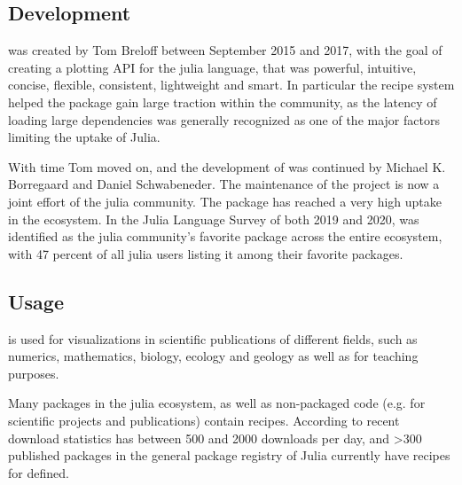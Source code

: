 \subsection*{Development}

\Plots was created by Tom Breloff between September 2015 and 2017, with the goal of creating a plotting API for the julia\cite{bezansonJuliaFreshApproach2017a} language, that was powerful, intuitive, concise, flexible, consistent, lightweight and smart.
In particular the recipe system helped the package gain large traction within the community, as the latency of loading large dependencies was generally recognized as one of the major factors limiting the uptake of Julia.

With time Tom moved on, and the development of \Plots was continued by Michael K. Borregaard and Daniel Schwabeneder.
The maintenance of the project is now a joint effort of the julia community.
The package has reached a very high uptake in the ecosystem.
In the Julia Language Survey of both 2019\cite{shahJuliaUserDeveloper} and 2020\cite{shah2020JuliaUser}, \Plots was identified as the julia community's favorite package across the entire ecosystem, with 47 percent of all julia users listing it among their favorite packages.

\subsection*{Usage}

\Plots is used for visualizations in scientific publications of different fields, such as numerics\cite{rackauckasDifferentialEquationsJlPerformant2017a,baggecarlsonMonteCarloMeasurementsJlPropagation2019,caldwellBATJlUpgrading2020,cufarRipsererJlFlexible2020,fairbrotherGaussianProcessesJlNonparametric2019,lindnerNetworkDynamicsJlComposing2021}, mathematics\cite{driscollComplexRegionsJlJulia2019}, biology\cite{angevaareInfectiousDiseaseTransmission2020,bonhamMicrobiomeJlBiobakeryUtils2021}, ecology\cite{dansereauSimpleSDMLayersJlGBIF2021} and geology\cite{constantinouGeophysicalFlowsJlSolvers2021,KellerSilicaCrust2020} as well as for teaching purposes\cite{boydIntroductionAppliedLinear2018,IntroductionComputationalThinking}.


Many packages in the julia ecosystem, as well as non-packaged code (e.g. for scientific projects and publications) contain \Plots recipes.
According to recent download statistics\cite{PackageDownloadStats} \Plots has between 500 and 2000 downloads per day, and >300 published packages in the general package registry of Julia currently have recipes for \Plots defined.


